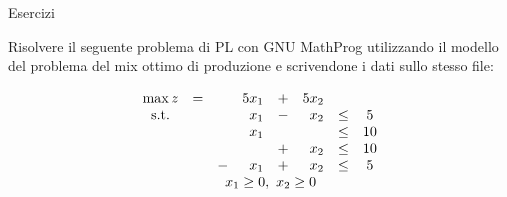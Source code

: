 \documentclass{beamer}
\begin{document}
\generatitolo

\def\rombo{$$
\begin{array}{cccrcrcc}
	\max z	&=	& 	&5 x_{1}	&+&5 x_{2}\\
	\mbox{s.t.}	&	& & x_{1}	&-& x_{2}	&\leq	& 5\\
				&	& & x_{1}	& &     	&\leq	&10\\
				&	& &			&+& x_{2}	&\leq	&10\\
				&	&-& x_{1}	&+& x_{2}	&\leq	& 5\\
	&	&\multicolumn{4}{c}{x_{1} \geq 0,\ x_{2}\geq 0}
\end{array}
$$}

\begin{frame}%
{Esercizi}

Risolvere il seguente problema di PL con GNU MathProg
utilizzando il modello del problema del mix ottimo
di produzione e scrivendone i dati sullo stesso
file:

\begin{enumerate}
{\footnotesize \item \rombo}
\end{enumerate}

\end{frame}
\end{document}
